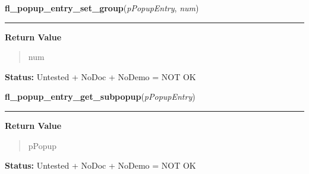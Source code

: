     \label{xformslib:flpopup:fl_popup_entry_set_group}

    \vspace{0.5ex}

\hspace{.8\funcindent}\begin{boxedminipage}{\funcwidth}

    \raggedright \textbf{fl\_popup\_entry\_set\_group}(\textit{pPopupEntry}, \textit{num})

    \vspace{-1.5ex}

    \rule{\textwidth}{0.5\fboxrule}
\setlength{\parskip}{2ex}
\setlength{\parskip}{1ex}
      \textbf{Return Value}
    \vspace{-1ex}

      \begin{quote}
      num

      \end{quote}

\textbf{Status:} Untested + NoDoc + NoDemo = NOT OK



    \end{boxedminipage}

    \label{xformslib:flpopup:fl_popup_entry_get_subpopup}

    \vspace{0.5ex}

\hspace{.8\funcindent}\begin{boxedminipage}{\funcwidth}

    \raggedright \textbf{fl\_popup\_entry\_get\_subpopup}(\textit{pPopupEntry})

    \vspace{-1.5ex}

    \rule{\textwidth}{0.5\fboxrule}
\setlength{\parskip}{2ex}
\setlength{\parskip}{1ex}
      \textbf{Return Value}
    \vspace{-1ex}

      \begin{quote}
      pPopup

      \end{quote}

\textbf{Status:} Untested + NoDoc + NoDemo = NOT OK



    \end{boxedminipage}

